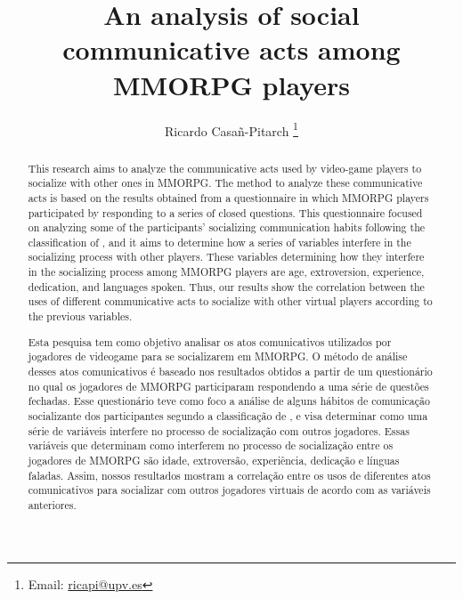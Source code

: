 \documentclass[english]{textolivre}
\title{An analysis of social communicative acts among MMORPG players}
\author[1]{Ricardo Casañ-Pitarch \orcid{0000-0002-1689-7954} \thanks{Email: \url{ricapi@upv.es}}}
\affil[1]{Universitat Politècnica de València, Department of Applied Linguistics, Valencia, Spain.}
\begin{document}
\maketitle

\begin{polyabstract}
\begin{abstract}
This research aims to analyze the communicative acts used by video-game players to socialize with other ones in MMORPG. The method to analyze these communicative acts is based on the results obtained from a questionnaire in which MMORPG players participated by responding to a series of closed questions. This questionnaire focused on analyzing some of the participants’ socializing communication habits following the classification of \textcite[p. 26]{guntermann1982}, and it aims to determine how a series of variables interfere in the socializing process with other players. These variables determining how they interfere in the socializing process among MMORPG players are age, extroversion, experience, dedication, and languages spoken. Thus, our results show the correlation between the uses of different communicative acts to socialize with other virtual players according to the previous variables. 

\end{abstract}

\begin{portuguese}
\begin{abstract}
Esta pesquisa tem como objetivo analisar os atos comunicativos utilizados por jogadores de videogame para se socializarem em MMORPG. O método de análise desses atos comunicativos é baseado nos resultados obtidos a partir de um questionário no qual os jogadores de MMORPG participaram respondendo a uma série de questões fechadas. Esse questionário teve como foco a análise de alguns hábitos de comunicação socializante dos participantes segundo a classificação de \textcite[p. 26]{guntermann1982}, e visa determinar como uma série de variáveis interfere no processo de socialização com outros jogadores. Essas variáveis que determinam como interferem no processo de socialização entre os jogadores de MMORPG são idade, extroversão, experiência, dedicação e línguas faladas. Assim, nossos resultados mostram a correlação entre os usos de diferentes atos comunicativos para socializar com outros jogadores virtuais de acordo com as variáveis anteriores.

\end{abstract}
\end{portuguese}

\end{polyabstract}
\end{document}
